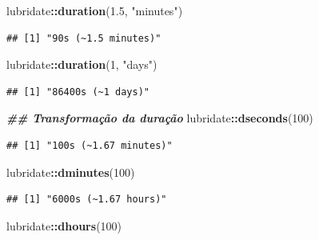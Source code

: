 \documentclass[
]{article}
\newenvironment{Shaded}{\begin{snugshade}}{\end{snugshade}}
\newcommand{\DecValTok}[1]{\textcolor[rgb]{0.00,0.00,0.81}{#1}}
\newcommand{\DocumentationTok}[1]{\textcolor[rgb]{0.56,0.35,0.01}{\textbf{\textit{#1}}}}
\newcommand{\FloatTok}[1]{\textcolor[rgb]{0.00,0.00,0.81}{#1}}
\newcommand{\FunctionTok}[1]{\textcolor[rgb]{0.13,0.29,0.53}{\textbf{#1}}}
\newcommand{\NormalTok}[1]{#1}
\newcommand{\SpecialCharTok}[1]{\textcolor[rgb]{0.81,0.36,0.00}{\textbf{#1}}}
\newcommand{\StringTok}[1]{\textcolor[rgb]{0.31,0.60,0.02}{#1}}
\begin{document}
\begin{Shaded}
\begin{Highlighting}[]
\NormalTok{lubridate}\SpecialCharTok{::}\FunctionTok{duration}\NormalTok{(}\FloatTok{1.5}\NormalTok{, }\StringTok{"minutes"}\NormalTok{)}
\end{Highlighting}
\end{Shaded}

\begin{verbatim}
## [1] "90s (~1.5 minutes)"
\end{verbatim}

\begin{Shaded}
\begin{Highlighting}[]
\NormalTok{lubridate}\SpecialCharTok{::}\FunctionTok{duration}\NormalTok{(}\DecValTok{1}\NormalTok{, }\StringTok{"days"}\NormalTok{)}
\end{Highlighting}
\end{Shaded}

\begin{verbatim}
## [1] "86400s (~1 days)"
\end{verbatim}

\begin{Shaded}
\begin{Highlighting}[]
\DocumentationTok{\#\# Transformação da duração}
\NormalTok{lubridate}\SpecialCharTok{::}\FunctionTok{dseconds}\NormalTok{(}\DecValTok{100}\NormalTok{)}
\end{Highlighting}
\end{Shaded}

\begin{verbatim}
## [1] "100s (~1.67 minutes)"
\end{verbatim}

\begin{Shaded}
\begin{Highlighting}[]
\NormalTok{lubridate}\SpecialCharTok{::}\FunctionTok{dminutes}\NormalTok{(}\DecValTok{100}\NormalTok{)}
\end{Highlighting}
\end{Shaded}

\begin{verbatim}
## [1] "6000s (~1.67 hours)"
\end{verbatim}

\begin{Shaded}
\begin{Highlighting}[]
\NormalTok{lubridate}\SpecialCharTok{::}\FunctionTok{dhours}\NormalTok{(}\DecValTok{100}\NormalTok{)}
\end{Highlighting}
\end{Shaded}
\end{document}
